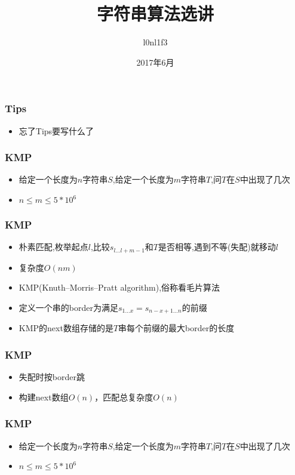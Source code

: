 \documentclass[notheorems]{beamer}
\begin{document}
\title[字符串算法选讲]{字符串算法选讲}
\author[l0nl1f3]{l0nl1f3}
\date[June, 2017]{2017年6月}
\frame{\titlepage}

\begin{frame}
\frametitle{Tips}
\begin{itemize}[]  
\item 忘了Tips要写什么了
\end{itemize}
\end{frame}

\begin{frame}
\frametitle{KMP}
\begin{itemize}[]
\item 给定一个长度为$n$字符串$S$,给定一个长度为$m$字符串$T$,问$T$在$S$中出现了几次 
\pause
\item $n\leq m\leq 5*10^6$
\end{itemize}
\end{frame}

\begin{frame}
\frametitle{KMP}
\begin{itemize}[]
\item 朴素匹配,枚举起点$l$,比较$s_{l\ldots l+m-1}$和$T$是否相等,遇到不等(失配)就移动$l$
\item 复杂度$O(nm)$
\pause
\item KMP(Knuth–Morris–Pratt algorithm),俗称看毛片算法
\pause
\item 定义一个串的border为满足$s_{1\ldots x} = s_{n-x+1\ldots n}$的前缀
\pause
\item KMP的next数组存储的是$T$串每个前缀的最大border的长度
\end{itemize}
\end{frame}

\begin{frame}
\frametitle{KMP}
\begin{itemize}[]
\item 失配时按border跳
\pause
\item 构建next数组$O(n)$，匹配总复杂度$O(n)$
\end{itemize}
\end{frame}

\begin{frame}
\frametitle{KMP}
\begin{itemize}[]
\item 给定一个长度为$n$字符串$S$,给定一个长度为$m$字符串$T$,问$T$在$S$中出现了几次 
\pause
\item $n\leq m\leq 5*10^6$
\end{itemize}
\end{frame}
\end{document}
